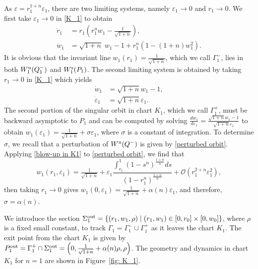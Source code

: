 \documentclass{article}
\theoremstyle{definition}
\numberwithin{equation}{section}
\begin{document}
As $\varepsilon=r_1^{1+n}\varepsilon_1$, there are two limiting systems, namely $\varepsilon_1\to0$ and $r_1\to0$. We first take $\varepsilon_1\to 0$ in \eqref{K_1} to obtain 
\begin{equation}
    \begin{aligned}
        \dot{r}_1&=r_1\left(r_1^n w_1-\tfrac{1}{\sqrt{1+n}}\right),\\
        \dot{w}_1&=\sqrt{1+n}\;w_1-1+r_1^n(1-(1+n)w_1^2).
        \label{K_1 eps_1=0}
    \end{aligned}
\end{equation}
It is obvious that the invariant line $w_1(r_1)=\tfrac{1}{\sqrt{1+n}}$, which we call $\Gamma_1^-$, lies in both $W_1^{\rm u}(Q_1^-)$ and $W_1^{\rm s}(P_1)$. 
The second limiting system is obtained by taking $r_1\to0$ in \eqref{K_1} which yields
\begin{equation}
    \begin{aligned}
        \dot{w}_1&=\sqrt{1+n}w_1-1,\\
        \dot{\varepsilon}_1&=\sqrt{1+n}\varepsilon_1.
        \label{K_1, r_1=0}
    \end{aligned}
\end{equation}
The second portion of the singular orbit in chart $K_1$, which we call $\Gamma_1^+$, must be backward asymptotic to $P_1$ and can be computed by solving 
$\tfrac{d {w}_1}{d{\varepsilon}_1}=\tfrac{\sqrt{1+n}w_1-1}{\sqrt{1+n}\varepsilon_1}$ to obtain $w_1(\varepsilon_1)=\tfrac{1}{\sqrt{1+n}}+\sigma\varepsilon_1$, where $\sigma$ is a constant of integration. To determine $\sigma$, we recall that a perturbation of $W^{\rm u}(Q^-)$ is given by \eqref{perturbed orbit}.  Applying \eqref{blow-up in K1} to \eqref{perturbed orbit}, we find that 
\begin{equation}
    w_1(r_1, \varepsilon_1)=\tfrac{1}{\sqrt{1+n}}+\varepsilon_1
    \frac{\displaystyle \int_{r_1}^1 (1-s^n)^{\tfrac{1+n}{n}}ds}{(1-r_1^n)^{\tfrac{1+n}{n}}}+\mathcal{O}(r_1^{2+n}\varepsilon_1^2), 
    \label{w_1(r_1, eps_1)}
\end{equation}  
then taking $r_1\to0$ gives $w_1(0,\varepsilon_1)=\tfrac{1}{\sqrt{1+n}}+\alpha(n)\varepsilon_1$,
and therefore, $\sigma=\alpha(n)$.


We introduce the section $\Sigma_{1}^{\rm out}=\{(r_1, w_1, \rho)\;|\;(r_1, w_1)\in[0, r_0]\times[0, w_0]\}$, where $\rho$ is a fixed small constant, to track $\Gamma_1=\Gamma_1^-\cup\Gamma_1^+$ as it leaves the chart $K_1$. The exit point from the chart $K_1$ is given by $P_1^{\rm out}=\Gamma_1^+\cap\Sigma_1^{\rm out}=\left(0, \tfrac{1}{\sqrt{1+n}}+\alpha(n)\rho,  \rho\right)$.
The geometry and dynamics in chart $K_1$ for $n=1$ are shown in Figure~\ref{fig: K_1}.
\end{document}
